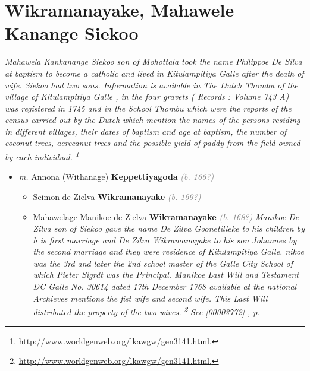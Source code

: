 \documentclass[10pt, openany]{book}
\begin{document}
\chapter{Wikramanayake, Mahawele Kanange Siekoo}
\label{00003769}
\textcolor{slmaroon}{\textit{Mahawela Kankanange Siekoo son of Mohottala took the name Philippoe De Silva at baptism to become a catholic and lived in Kitulampitiya Galle after the death of wife. Siekoo had two sons.
Information is available in The Dutch Thombu of the village of Kitulampitiya Galle , in the four gravets ( Records : Volume 743 A) was registered in 1745 and in the School Thombu which were the reports of the census carried out by the Dutch which mention the names of the persons residing in different villages, their dates of baptism and age at baptism, the number of coconut trees, aerecanut trees and the possible yield of paddy from the field owned by each individual.
\footnote{\url{http://www.worldgenweb.org/lkawgw/gen3141.html.}}}}
\begin{itemize}
\item{\textit{m.} Annona (Withanage) \textbf{Keppettiyagoda} \textcolor{gray}{\textit{(b. 166?)}}   \label{couple:00003769:00003770} \begin{itemize}
\item{Seimon de Zielva \textbf{Wikramanayake} \textcolor{gray}{\textit{(b. 169?)}}
   }
\item{Mahawelage Manikoe de Zielva \textbf{Wikramanayake} \textcolor{gray}{\textit{(b. 168?)}} \textcolor{slmaroon}{\textit{Manikoe De Zilva son of Siekoo gave the name De Zilva Goonetilleke to his children by h is first marriage and De Zilva Wikramanayake to his son Johannes by the second marriage and they were residence of Kitulampitiya Galle.
nikoe was the 3rd and later the 2nd school master of the Galle City School of which Pieter Sigrdt was the Principal.
Manikoe Last Will and Testament DC Galle No. 30614 dated 17th December 1768 available at the national Archieves mentions the fist wife and second wife. This Last Will distributed the property of the two wives.
\footnote{\url{http://www.worldgenweb.org/lkawgw/gen3141.html.}}}} \textcolor{slteal}{\textit{See  \autoref{00003772} \textit{, p. \pageref{00003772} }}}}
\end{itemize}}
\end{itemize}
   
\end{document}

